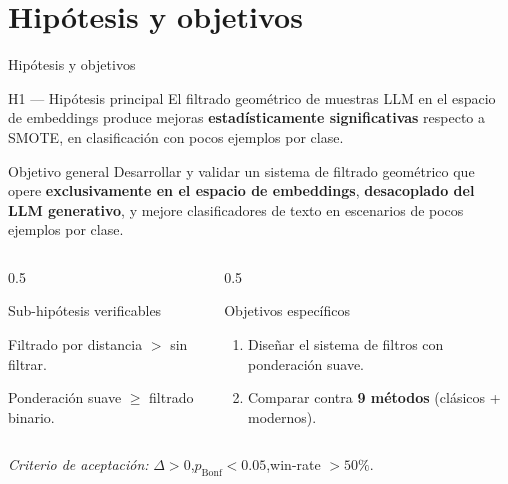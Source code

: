 
\section{Hipótesis y objetivos}

\begin{frame}{Hipótesis y objetivos}
\begin{block}{H1 — Hipótesis principal}
\small
El filtrado geométrico de muestras LLM en el espacio de embeddings produce
mejoras \textbf{estadísticamente significativas} respecto a SMOTE,
en clasificación con pocos ejemplos por clase.
\end{block}

\begin{block}{Objetivo general}
\small
Desarrollar y validar un sistema de filtrado geométrico que opere
\textbf{exclusivamente en el espacio de embeddings}, \textbf{desacoplado del LLM generativo},
y mejore clasificadores de texto en escenarios de pocos ejemplos por clase.
\end{block}

\vspace{0.2em}
\begin{columns}[T]

\begin{column}{0.5\textwidth}
\begin{block}{Sub-hipótesis verificables}
\scriptsize
\begin{description}\setlength\itemsep{0pt}
  \item[H1a] Filtrado por distancia $>$ sin filtrar.
  \item[H1b] Ponderación suave $\geq$ filtrado binario.
\end{description}
\end{block}
\end{column}

\begin{column}{0.5\textwidth}
\begin{block}{Objetivos específicos}
\scriptsize
\begin{enumerate}\setlength\itemsep{0pt}
  \item Diseñar el sistema de filtros con ponderación suave.
  \item Comparar contra \textbf{9 métodos} (clásicos + modernos).
\end{enumerate}
\end{block}
\end{column}

\end{columns}

\vspace{0.2em}
{\scriptsize\itshape Criterio de aceptación:}
{\scriptsize $\Delta>0$,\quad $p_{\text{Bonf}}<0.05$,\quad win-rate $>50\%$.}
\end{frame}

